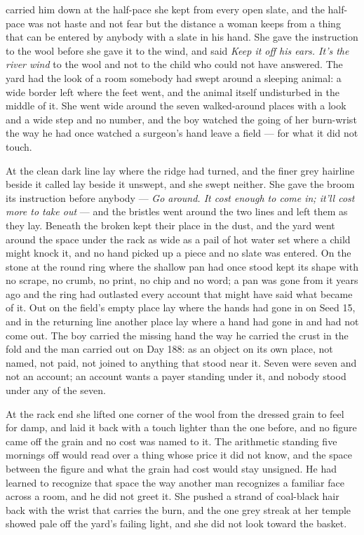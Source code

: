 \scenebreak

 carried him down at the half-pace she kept from every open slate, and the half-pace was not haste and not fear but the distance a woman keeps from a thing that can be entered by anybody with a slate in his hand. She gave the instruction to the wool before she gave it to the wind, and said \emph{Keep it off his ears. It's the river wind} to the wool and not to the child who could not have answered. The yard had the look of a room somebody had swept around a sleeping animal: a wide border left where the feet went, and the animal itself undisturbed in the middle of it. She went wide around the seven walked-around places with a look and a wide step and no number, and the boy watched the going of her burn-wrist the way he had once watched a surgeon's hand leave a field --- for what it did not touch.

At  the clean dark line lay where the ridge had turned, and the finer grey hairline beside it called  lay beside it unswept, and she swept neither. She gave the broom its instruction before anybody --- \emph{Go around. It cost enough to come in; it'll cost more to take out} --- and the bristles went around the two lines and left them as they lay. Beneath  the broken  kept their place in the dust, and the yard went around the space under the rack as wide as a pail of hot water set where a child might knock it, and no hand picked up a piece and no slate was entered. On the stone at  the round ring where the shallow pan had once stood kept its shape with no scrape, no crumb, no print, no chip and no word; a pan was gone from it years ago and the ring had outlasted every account that might have said what became of it. Out on  the field's empty place lay where the hands had gone in on Seed 15, and in the returning line another place lay where a hand had gone in and had not come out. The boy carried the missing hand the way he carried the crust in the fold and the man carried out on Day 188: as an object on its own place, not named, not paid, not joined to anything that stood near it. Seven were seven and not an account; an account wants a payer standing under it, and nobody stood under any of the seven.

At the rack end she lifted one corner of the wool from the dressed grain to feel for damp, and laid it back with a touch lighter than the one before, and no figure came off the grain and no cost was named to it. The arithmetic standing five mornings off would read over a thing whose price it did not know, and the space between the figure and what the grain had cost would stay unsigned. He had learned to recognize that space the way another man recognizes a familiar face across a room, and he did not greet it. She pushed a strand of coal-black hair back with the wrist that carries the burn, and the one grey streak at her temple showed pale off the yard's failing light, and she did not look toward the basket.

